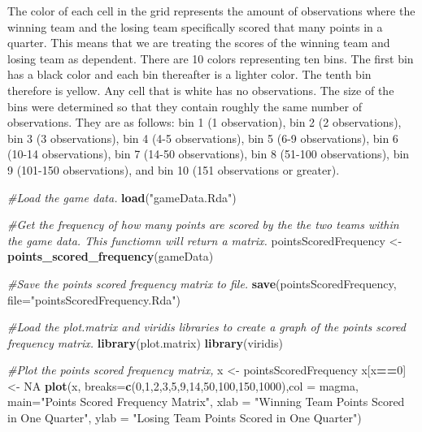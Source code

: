 \documentclass[
]{article}
\newenvironment{Shaded}{\begin{snugshade}}{\end{snugshade}}
\newcommand{\CommentTok}[1]{\textcolor[rgb]{0.56,0.35,0.01}{\textit{#1}}}
\newcommand{\DataTypeTok}[1]{\textcolor[rgb]{0.13,0.29,0.53}{#1}}
\newcommand{\DecValTok}[1]{\textcolor[rgb]{0.00,0.00,0.81}{#1}}
\newcommand{\KeywordTok}[1]{\textcolor[rgb]{0.13,0.29,0.53}{\textbf{#1}}}
\newcommand{\NormalTok}[1]{#1}
\newcommand{\OperatorTok}[1]{\textcolor[rgb]{0.81,0.36,0.00}{\textbf{#1}}}
\newcommand{\OtherTok}[1]{\textcolor[rgb]{0.56,0.35,0.01}{#1}}
\newcommand{\StringTok}[1]{\textcolor[rgb]{0.31,0.60,0.02}{#1}}
\begin{document}
The color of each cell in the grid represents the amount of observations
where the winning team and the losing team specifically scored that many
points in a quarter. This means that we are treating the scores of the
winning team and losing team as dependent. There are 10 colors
representing ten bins. The first bin has a black color and each bin
thereafter is a lighter color. The tenth bin therefore is yellow. Any
cell that is white has no observations. The size of the bins were
determined so that they contain roughly the same number of observations.
They are as follows: bin 1 (1 observation), bin 2 (2 observations), bin
3 (3 observations), bin 4 (4-5 observations), bin 5 (6-9 observations),
bin 6 (10-14 observations), bin 7 (14-50 observations), bin 8 (51-100
observations), bin 9 (101-150 observations), and bin 10 (151
observations or greater).

\begin{Shaded}
\begin{Highlighting}[]
\CommentTok{#Load the game data.}
\KeywordTok{load}\NormalTok{(}\StringTok{"gameData.Rda"}\NormalTok{)}

\CommentTok{#Get the frequency of how many points are scored by the the two teams within the game data. This functiomn will return a matrix.}
\NormalTok{pointsScoredFrequency <-}\StringTok{ }\KeywordTok{points_scored_frequency}\NormalTok{(gameData)}

\CommentTok{#Save the points scored frequency matrix to file.}
\KeywordTok{save}\NormalTok{(pointsScoredFrequency, }\DataTypeTok{file=}\StringTok{"pointsScoredFrequency.Rda"}\NormalTok{)}

\CommentTok{#Load the plot.matrix and viridis libraries to create a graph of the points scored frequency matrix.}
\KeywordTok{library}\NormalTok{(plot.matrix)}
\KeywordTok{library}\NormalTok{(viridis)}

\CommentTok{#Plot the points scored frequency matrix,}
\NormalTok{x <-}\StringTok{ }\NormalTok{pointsScoredFrequency}
\NormalTok{x[x}\OperatorTok{==}\DecValTok{0}\NormalTok{] <-}\StringTok{ }\OtherTok{NA}
\KeywordTok{plot}\NormalTok{(x, }\DataTypeTok{breaks=}\KeywordTok{c}\NormalTok{(}\DecValTok{0}\NormalTok{,}\DecValTok{1}\NormalTok{,}\DecValTok{2}\NormalTok{,}\DecValTok{3}\NormalTok{,}\DecValTok{5}\NormalTok{,}\DecValTok{9}\NormalTok{,}\DecValTok{14}\NormalTok{,}\DecValTok{50}\NormalTok{,}\DecValTok{100}\NormalTok{,}\DecValTok{150}\NormalTok{,}\DecValTok{1000}\NormalTok{),}\DataTypeTok{col =}\NormalTok{ magma, }\DataTypeTok{main=}\StringTok{"Points Scored Frequency Matrix"}\NormalTok{, }\DataTypeTok{xlab =} \StringTok{"Winning Team Points Scored in One Quarter"}\NormalTok{, }\DataTypeTok{ylab =} \StringTok{"Losing Team Points Scored in One Quarter"}\NormalTok{)}
\end{Highlighting}
\end{Shaded}
\end{document}
